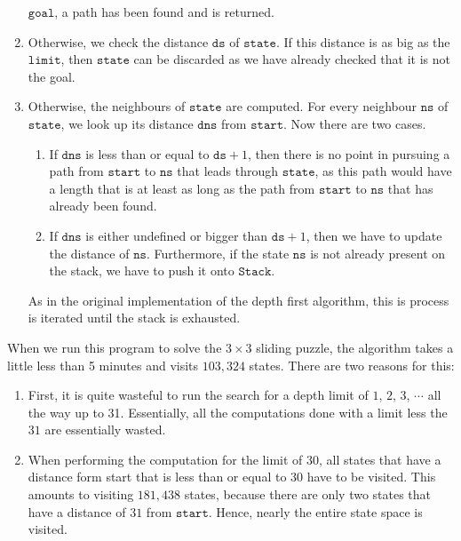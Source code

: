 \begin{enumerate}
      $\mathtt{goal}$, a path has been found and is returned.
\item Otherwise, we check the distance $\mathtt{ds}$ of $\mathtt{state}$.  If this distance is as big as the
      $\mathtt{limit}$, then $\mathtt{state}$ can be discarded as we have already checked that it is not the goal.
\item Otherwise, the neighbours of $\mathtt{state}$ are computed.  For every neighbour $\mathtt{ns}$ of
      $\mathtt{state}$, we look up its distance $\mathtt{dns}$ from $\mathtt{start}$.
      Now there are two cases.
      \begin{enumerate}
      \item If $\mathtt{dns}$ is less than or equal to $\mathtt{ds} + 1$, then 
            there is no point in pursuing a path from $\mathtt{start}$ to $\mathtt{ns}$ that leads through
            $\mathtt{state}$, as this path would have a length that is at least as long as the path from
            $\mathtt{start}$ to $\mathtt{ns}$ that has already been found.
      \item If $\mathtt{dns}$ is either undefined or bigger than $\mathtt{ds} + 1$, then
            we have to update the distance of $\mathtt{ns}$.  Furthermore, if the state $\mathtt{ns}$ is not
            already present on the stack, we have to push it onto $\mathtt{Stack}$.
      \end{enumerate}
      As in the original implementation of the depth first algorithm, this is process is iterated until the
      stack is exhausted.
\end{enumerate}
When we run this program to solve the $3 \times 3$ sliding puzzle, the algorithm takes a little less than 5
minutes and visits $103,324$ states.  There are two reasons for this:
\begin{enumerate}
\item First, it is quite wasteful to run the search for a depth limit of $1$, $2$, $3$, $\cdots$ all the way up
      to 31.  Essentially, all the computations done with a limit less the $31$ are essentially wasted.
\item When performing  the computation for the limit of $30$, all states that have a distance form start that
      is less than or equal to $30$ have to be visited.  This amounts to visiting $181,438$ states, because there
      are only two states that have a distance of $31$ from $\mathtt{start}$.  Hence, nearly the entire
      state space is visited.
\end{enumerate}

